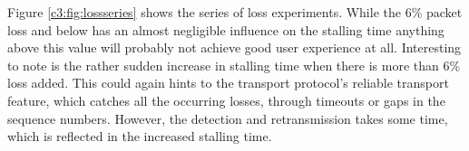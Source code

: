 Figure \ref{c3:fig:lossseries} shows the series of loss experiments. While the 6\% packet loss and below has an almost negligible influence on the stalling time anything above this value will probably not achieve good user experience at all. Interesting to note is the rather sudden increase in stalling time when there is more than 6\% loss added. This could again hints to the transport protocol's reliable transport feature, which catches all the occurring losses, through timeouts or gaps in the sequence numbers. However, the detection and retransmission takes some time, which is reflected in the increased stalling time.






